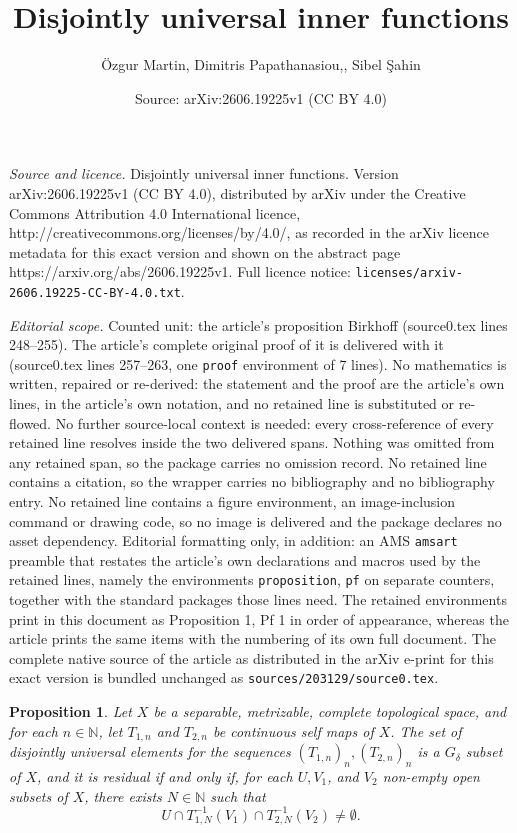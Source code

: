 \documentclass[10pt,a4paper]{amsart}
\title{Disjointly universal inner functions}
\author{\"Ozgur Martin, Dimitris Papathanasiou,, Sibel \c{S}ahin}
\date{Source: arXiv:2606.19225v1 (CC BY 4.0)}
\newtheorem{proposition}{Proposition}
\begin{document}
\maketitle

\noindent\emph{Source and licence.} Disjointly universal inner functions. Version arXiv:2606.19225v1 (CC BY 4.0), distributed by arXiv under the Creative Commons Attribution 4.0 International licence, http://creativecommons.org/licenses/by/4.0/, as recorded in the arXiv licence metadata for this exact version and shown on the abstract page https://arxiv.org/abs/2606.19225v1. Full licence notice: \texttt{licenses/arxiv-2606.19225-CC-BY-4.0.txt}.\par\smallskip

\noindent\textit{Editorial scope.} Counted unit: the article's proposition Birkhoff (source0.tex lines 248--255). The article's complete original proof of it is delivered with it (source0.tex lines 257--263, one \texttt{proof} environment of 7 lines). No mathematics is written, repaired or re-derived: the statement and the proof are the article's own lines, in the article's own notation, and no retained line is substituted or re-flowed.  No further source-local context is needed: every cross-reference of every retained line resolves inside the two delivered spans.  Nothing was omitted from any retained span, so the package carries no omission record.  No retained line contains a citation, so the wrapper carries no bibliography and no bibliography entry.  No retained line contains a figure environment, an image-inclusion command or drawing code, so no image is delivered and the package declares no asset dependency.  Editorial formatting only, in addition: an AMS \texttt{amsart} preamble that restates the article's own declarations and macros used by the retained lines, namely the environments \texttt{proposition}, \texttt{pf} on separate counters, together with the standard packages those lines need.  The retained environments print in this document as Proposition 1, Pf 1 in order of appearance, whereas the article prints the same items with the numbering of its own full document.  The complete native source of the article as distributed in the arXiv e-print for this exact version is bundled unchanged as \texttt{sources/203129/source0.tex}.
\begin{proposition} \label{Birkhoff}
Let $X$ be a separable, metrizable, complete topological space, 
and for each $n\in \mathbb{N}$, let $T_{1,n}$ and $T_{2,n}$ be continuous self maps of $X$. The set of disjointly universal elements for the sequences $(T_{1,n})_n, (T_{2,n})_n$  is a $G_{\delta}$ subset of $X$, and it is residual if and only if, for each $U, V_1$, and $V_2$ non-empty open subsets of $X$, there exists $N\in \mathbb{N}$ such that
\begin{equation}\label{Baire}
U \cap T^{-1}_{1,N} (V_1) \cap T^{-1}_{2,N} (V_2) \neq \emptyset.
\end{equation}
\end{proposition}
\end{document}
